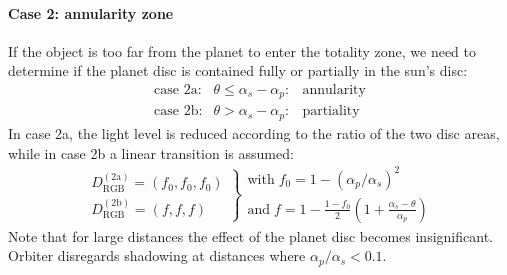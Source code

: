 \documentclass[Orbiter Technical Reference.tex]{subfiles}
\begin{document}
\paragraph{Case 2: annularity zone}\label{sec:noatm_annul}
If the object is too far from the planet to enter the totality zone, we need to determine if the planet disc is contained fully or partially in the sun's disc:
\begin{equation}
\begin{array}{lcl}
\text{case 2a:} & \theta \leq \alpha_s-\alpha_p: & \text{annularity}\\
\text{case 2b:} & \theta > \alpha_s-\alpha_p: & \text{partiality}
\end{array}
\end{equation}
In case 2a, the light level is reduced according to the ratio of the two disc areas, while in case 2b a linear transition is assumed:
\begin{equation}
\left.
\begin{array}{l}
D_\text{RGB}^{(\text{2a})} = (f_0,f_0,f_0)\\
D_\text{RGB}^{(\text{2b})} = (f,f,f)
\end{array}
\right\rbrace
\begin{array}{l}
\text{with}\; f_0 = 1-(\alpha_p/\alpha_s)^2\\
\text{and}\; f = 1-\frac{1-f_0}{2} (1+\frac{\alpha_s-\theta}{\alpha_p})
\end{array}
\end{equation}
Note that for large distances the effect of the planet disc becomes insignificant. Orbiter disregards shadowing at distances where $\alpha_p/\alpha_s < 0.1$.
\end{document}
